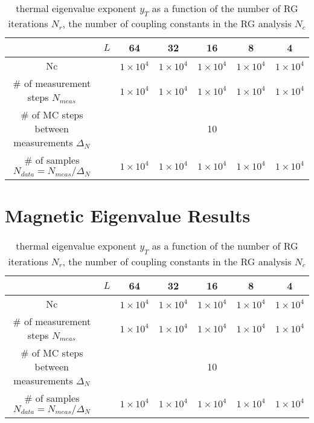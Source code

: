 \documentclass{article}
\begin{document}
\begin{table}[H]
\centering
\begin{tabular}{|c|c|c|c|c|c|c|} 
 \hline
 &$L$ & 64 & 32 & 16 & 8 &4 \\ 
 \hline
 Nc& & $1\times 10^4$& $1\times 10^4$& $1\times 10^4$& $1\times 10^4$& $1\times 10^4$ \\ 
 \hline
 \# of measurement steps $N_{meas}$& & $1\times 10^4$& $1\times 10^4$& $1\times 10^4$& $1\times 10^4$& $1\times 10^4$ \\
 \hline
 \# of MC steps between measurements $\Delta_N$& & \multicolumn{5}{c|}{10}\\
 \hline
 \# of samples $N_{data} = N_{meas}/\Delta_{N}$  & & $1\times 10^4$& $1\times 10^4$& $1\times 10^4$& $1\times 10^4$& $1\times 10^4$ \\
 \hline
 \end{tabular}
 \caption{\label{yT}thermal eigenvalue
exponent $y_T$ as a function of the number of RG iterations $N_r$, the number of coupling
constants in the RG analysis $N_c$}
\end{table}


\section{Magnetic Eigenvalue Results}

\begin{table}[H]
\centering
\begin{tabular}{|c|c|c|c|c|c|c|} 
 \hline
 &$L$ & 64 & 32 & 16 & 8 &4 \\ 
 \hline
 Nc& & $1\times 10^4$& $1\times 10^4$& $1\times 10^4$& $1\times 10^4$& $1\times 10^4$ \\ 
 \hline
 \# of measurement steps $N_{meas}$& & $1\times 10^4$& $1\times 10^4$& $1\times 10^4$& $1\times 10^4$& $1\times 10^4$ \\
 \hline
 \# of MC steps between measurements $\Delta_N$& & \multicolumn{5}{c|}{10}\\
 \hline
 \# of samples $N_{data} = N_{meas}/\Delta_{N}$  & & $1\times 10^4$& $1\times 10^4$& $1\times 10^4$& $1\times 10^4$& $1\times 10^4$ \\
 \hline
 \end{tabular}
 \caption{\label{yH}thermal eigenvalue
exponent $y_T$ as a function of the number of RG iterations $N_r$, the number of coupling
constants in the RG analysis $N_c$}
\end{table}




\end{document}
